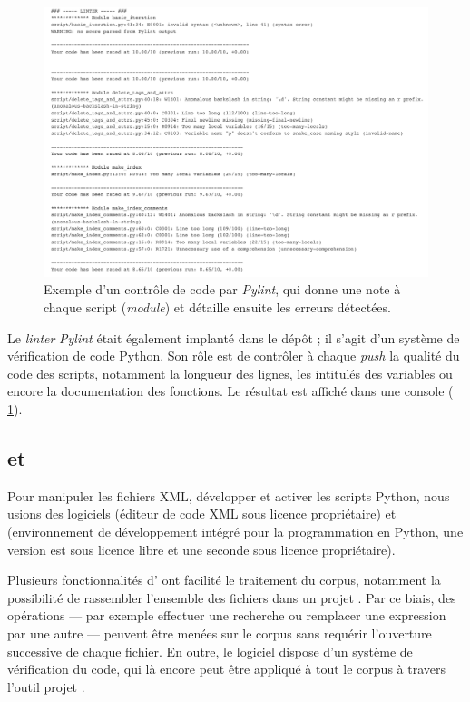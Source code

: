 \begin{figure}
    \centering
    \includegraphics[width=15cm]{img/pylint_output.png}
    \caption{Exemple d'un contrôle de code par \textit{Pylint}, qui donne une note à chaque script (\textit{module}) et détaille ensuite les erreurs détectées.}
    \label{fig:pylint}
\end{figure}

Le \textit{linter} \textit{Pylint} était également implanté dans le dépôt ; il s'agit d'un système de vérification de code Python. Son rôle est de contrôler à chaque \textit{push} la qualité du code des scripts, notamment la longueur des lignes, les intitulés des variables ou encore la documentation des fonctions. Le résultat est affiché dans une console (\fig{} \ref{fig:pylint}).

\subsection{\pycharm{} et \oxygen}

Pour manipuler les fichiers XML, développer et activer les scripts Python, nous usions des logiciels \oxygen{} (éditeur de code XML sous licence propriétaire) et \pycharm{} (environnement de développement intégré pour la programmation en Python, une version est sous licence libre et une seconde sous licence propriétaire). 

Plusieurs fonctionnalités d'\oxygen{} ont facilité le traitement du corpus, notamment la possibilité de rassembler l'ensemble des fichiers dans un \og projet \fg. Par ce biais, des opérations --- par exemple effectuer une recherche ou remplacer une expression par une autre --- peuvent être menées sur le corpus sans requérir l'ouverture successive de chaque fichier. En outre, le logiciel dispose d'un système de vérification du code, qui là encore peut être appliqué à tout le corpus à travers l'outil \og projet \fg.

